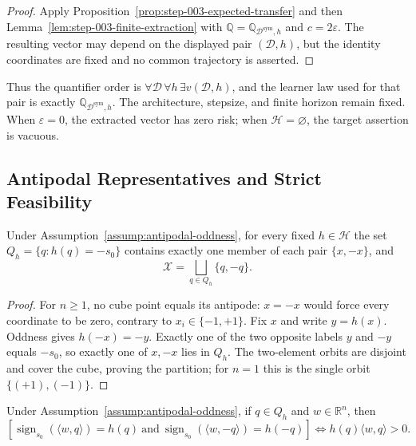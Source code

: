 \begin{proof}
Apply Proposition~\ref{prop:step-003-expected-transfer} and then
Lemma~\ref{lem:step-003-finite-extraction} with
$\mathbb Q=\mathbb Q_{\mathcal D^{\mathrm{sym}},h}$ and $c=2\varepsilon$.
The resulting vector may depend on the displayed pair $(\mathcal D,h)$, but
the identity coordinates are fixed and no common trajectory is asserted.
\end{proof}

Thus the quantifier order is
$\forall\mathcal D\,\forall h\,\exists v(\mathcal D,h)$, and the learner law
used for that pair is exactly
$\mathbb Q_{\mathcal D^{\mathrm{sym}},h}$.  The architecture, stepsize, and
finite horizon remain fixed.  When $\varepsilon=0$, the extracted vector has
zero risk; when $\mathcal H=\varnothing$, the target assertion is vacuous.

\subsection{Antipodal Representatives and Strict Feasibility}
\label{app:strict-interface}

\begin{lemma}
\label{lem:step-004-representatives}
Under Assumption~\ref{assump:antipodal-oddness}, for every fixed
$h\in\mathcal H$ the set $Q_h=\{q:h(q)=-s_0\}$ contains exactly one
member of each pair $\{x,-x\}$, and
\[
\mathcal X=\bigsqcup_{q\in Q_h}\{q,-q\}.
\]
\end{lemma}

\begin{proof}
For $n\geq1$, no cube point equals its antipode: $x=-x$ would force every
coordinate to be zero, contrary to $x_i\in\{-1,+1\}$.  Fix $x$ and write
$y=h(x)$.  Oddness gives $h(-x)=-y$.  Exactly one of the two opposite labels
$y$ and $-y$ equals $-s_0$, so exactly one of $x,-x$ lies in $Q_h$.  The
two-element orbits are disjoint and cover the cube, proving the partition;
for $n=1$ this is the single orbit $\{(+1),(-1)\}$.
\end{proof}

\begin{lemma}
\label{lem:step-004-pairwise-strictness}
Under Assumption~\ref{assump:antipodal-oddness}, if $q\in Q_h$ and
$w\in\mathbb R^n$, then
\[
\left[
\operatorname{sign}_{s_0}(\langle w,q\rangle)=h(q)\ \text{and}\ 
\operatorname{sign}_{s_0}(\langle w,-q\rangle)=h(-q)
\right]
\Longleftrightarrow h(q)\langle w,q\rangle>0.
\]
\end{lemma}

